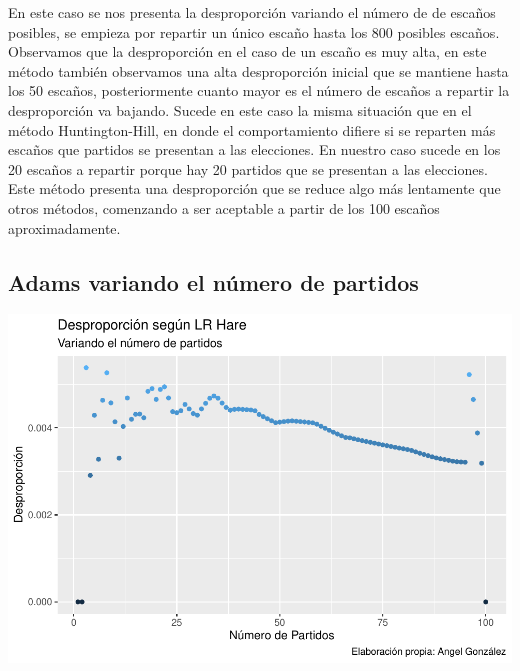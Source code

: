 \documentclass[12pt,a4paper,]{book}
\numberwithin{dummy}{section}
\theoremstyle{ocrenumbox}
\theoremstyle{blacknumex}
\theoremstyle{blacknumbox}
\theoremstyle{ocrenum}
\theoremstyle{ocrenum}
\begin{document}
En este caso se nos presenta la desproporción variando el número de de
escaños posibles, se empieza por repartir un único escaño hasta los 800
posibles escaños. Observamos que la desproporción en el caso de un
escaño es muy alta, en este método también observamos una alta
desproporción inicial que se mantiene hasta los 50 escaños,
posteriormente cuanto mayor es el número de escaños a repartir la
desproporción va bajando. Sucede en este caso la misma situación que en
el método Huntington-Hill, en donde el comportamiento difiere si se
reparten más escaños que partidos se presentan a las elecciones. En
nuestro caso sucede en los 20 escaños a repartir porque hay 20 partidos
que se presentan a las elecciones. Este método presenta una
desproporción que se reduce algo más lentamente que otros métodos,
comenzando a ser aceptable a partir de los 100 escaños aproximadamente.

\hypertarget{adams-variando-el-nuxfamero-de-partidos}{%
\subsection{Adams variando el número de
partidos}\label{adams-variando-el-nuxfamero-de-partidos}}

\begin{center}\includegraphics[width=0.95\linewidth]{figurasR/unnamed-chunk-42-1} \end{center}
\end{document}
